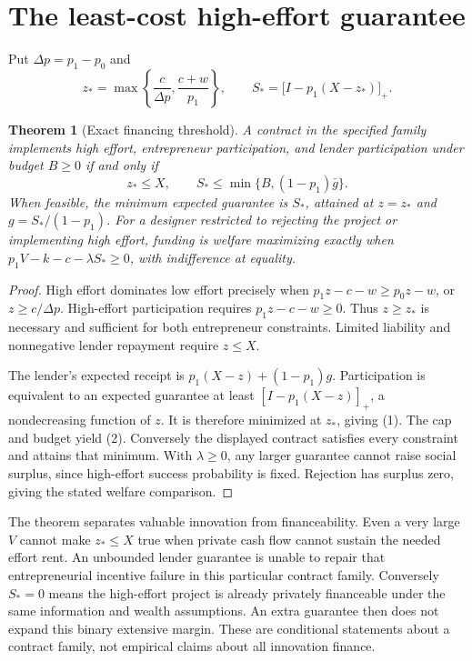 \documentclass[11pt]{article}
\newtheorem{theorem}{Theorem}
\theoremstyle{remark}
\begin{document}
\section{The least-cost high-effort guarantee}
Put $\Delta p=p_1-p_0$ and
\[
 z_* =\max\left\{\frac c{\Delta p},\frac{c+w}{p_1}\right\},\qquad
 S_* =\bigl[I-p_1(X-z_*)\bigr]_+.
 \tag{1}
\]
\begin{theorem}[Exact financing threshold]
A contract in the specified family implements high effort, entrepreneur
participation, and lender participation under budget $B\geq0$ if and only if
\[
 z_*\leq X,\qquad S_*\leq\min\{B,(1-p_1)\bar g\}. \tag{2}
\]
When feasible, the minimum expected guarantee is $S_*$, attained at
$z=z_*$ and $g=S_* /(1-p_1)$. For a designer restricted to rejecting the
project or implementing high effort, funding is welfare maximizing exactly
when $p_1V-k-c-\lambda S_*\geq0$, with indifference at equality.
\end{theorem}
\begin{proof}
High effort dominates low effort precisely when
$p_1z-c-w\geq p_0z-w$, or $z\geq c/\Delta p$.
High-effort participation requires $p_1z-c-w\geq0$.
Thus $z\geq z_*$ is necessary and sufficient for both entrepreneur
constraints. Limited liability and nonnegative lender repayment require
$z\leq X$.

The lender's expected receipt is $p_1(X-z)+(1-p_1)g$.
Participation is equivalent to an expected guarantee at least
$[I-p_1(X-z)]_+$, a nondecreasing function of $z$.
It is therefore minimized at $z_*$, giving (1). The cap and budget yield
(2). Conversely the displayed contract satisfies every constraint and
attains that minimum. With $\lambda\geq0$, any larger guarantee cannot
raise social surplus, since high-effort success probability is fixed.
Rejection has surplus zero, giving the stated welfare comparison.
\end{proof}

The theorem separates valuable innovation from financeability. Even a very
large $V$ cannot make $z_*\leq X$ true when private cash flow cannot sustain
the needed effort rent. An unbounded lender guarantee is unable to repair
that entrepreneurial incentive failure in this particular contract family.
Conversely $S_*=0$ means the high-effort project is already privately
financeable under the same information and wealth assumptions. An extra
guarantee then does not expand this binary extensive margin. These are
conditional statements about a contract family, not empirical claims about
all innovation finance.
\end{document}
